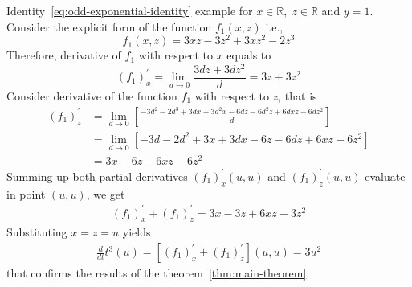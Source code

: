 \begin{example}
    \normalfont
    Identity~\eqref{eq:odd-exponential-identity} example for $x\in\mathbb{R}, \; z\in \mathbb{R}$ and $y=1$.
    Consider the explicit form of the function $f_{1} (x, z)$ i.e.,
    \[
        f_1(x, z) = 3 x z - 3 z^2 + 3 x z^2 - 2 z^3
    \]
    Therefore, derivative of $f_{1}$ with respect to $x$ equals to
    \[
        (f_1)^{'}_{x} = \lim_{d \to 0} \frac{3 d z + 3 d z^2}{d} = 3 z + 3 z^2
    \]
    Consider derivative of the function $f_1$ with respect to $z$, that is
    \begin{align*}
    (f_1)
        ^{'}_{z}
        &= \lim_{d \to 0} \left[\frac{-3 d^2 - 2 d^3 + 3 d x + 3 d^2 x - 6 d z - 6 d^2 z + 6 d x z - 6 d z^2}{d} \right] \\
        &= \lim_{d \to 0} \left[ -3 d - 2 d^2 + 3 x + 3 d x - 6 z - 6 d z + 6 x z - 6 z^2 \right] \\
        &=3 x - 6 z + 6 x z - 6 z^2
    \end{align*}
    Summing up both partial derivatives $(f_1)^{'}_{x} (u, u)$ and $(f_1)^{'}_{z} (u, u)$ evaluate in point $(u, u)$, we get
    \begin{align*}
    (f_1) ^{'}_{x} + (f_1)^{'}_{z} = 3 x - 3 z + 6 x z - 3 z^2
    \end{align*}
    Substituting $x=z=u$ yields
    \begin{align*}
        \frac{d}{dt} t^{3} (u) = [(f_1)^{'}_{x} + (f_1)^{'}_{z}] (u,u)  = 3 u^2
    \end{align*}
    that confirms the results of the theorem~\ref{thm:main-theorem}.
\end{example}
